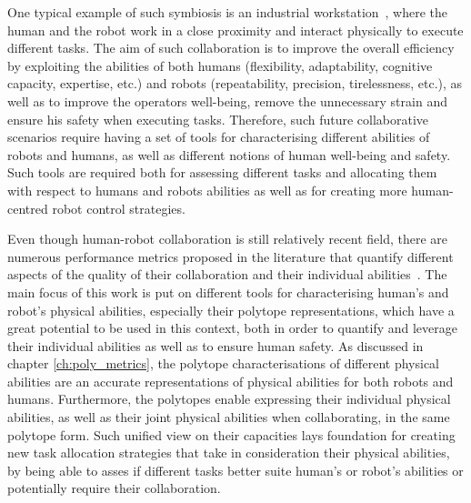 One typical example of such symbiosis is an industrial workstation~\cite{SIMOES2022workplace}, where the human and the robot work in a close proximity and interact physically to execute different tasks. The aim of such collaboration is to improve the overall efficiency by exploiting the abilities of both humans (flexibility, adaptability, cognitive capacity, expertise, etc.) and robots (repeatability, precision, tirelessness, etc.), as well as to improve the operators well-being, remove the unnecessary strain and ensure his safety when executing tasks. Therefore, such future collaborative scenarios require having a set of tools for characterising different abilities of robots and humans, as well as different notions of human well-being and safety. Such tools are required both for assessing different tasks and allocating them with respect to humans and robots abilities as well as for creating more human-centred robot control strategies.


Even though human-robot collaboration is still relatively recent field, there are numerous performance metrics proposed in the literature that quantify different aspects of the quality of their collaboration and their individual abilities~\cite{CORONADO2022collab_quality}.
The main focus of this work is put on different tools for characterising human's and robot's physical abilities, especially their polytope representations, which have a great potential to be used in this context, both in order to quantify and leverage their individual abilities as well as to ensure human safety. As discussed in chapter \ref{ch:poly_metrics}, the polytope characterisations of different physical abilities are an accurate representations of physical abilities for both robots and humans. Furthermore, the polytopes enable expressing their individual physical abilities, as well as their joint physical abilities when collaborating, in the same polytope form. Such unified view on their capacities lays foundation for creating new task allocation strategies that take in consideration their physical abilities, by being able to asses if different tasks better suite human's or robot's abilities or potentially require their collaboration. 

